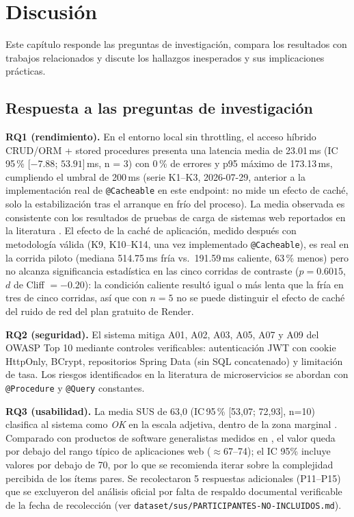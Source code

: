 \chapter{Discusión}
\label{cap:discusion}

Este capítulo responde las preguntas de investigación, compara los resultados con
trabajos relacionados y discute los hallazgos inesperados y sus implicaciones
prácticas.

\section{Respuesta a las preguntas de investigación}

\textbf{RQ1 (rendimiento).} En el entorno local sin throttling, el acceso
híbrido CRUD/ORM + stored procedures presenta una latencia media de
23.01\,ms (IC\,95\,\% [$-7.88$; $53.91$]\,ms, n = 3) con 0\,\% de errores y
p95 máximo de 173.13\,ms, cumpliendo el umbral de 200\,ms (serie K1--K3,
2026-07-29, anterior a la implementación real de \texttt{@Cacheable} en
este endpoint: no mide un efecto de caché, solo la estabilización tras el
arranque en frío del proceso). La media observada es consistente con los
resultados de pruebas de carga de sistemas web reportados en la
literatura \cite{jiang2015,jiang2009}. El efecto de la caché de
aplicación, medido después con metodología válida (K9, K10--K14, una vez
implementado \texttt{@Cacheable}), es real en la corrida piloto (mediana
514.75\,ms fría vs.\ 191.59\,ms caliente, 63\,\% menos) pero no alcanza
significancia estadística en las cinco corridas de contraste
($p=0.6015$, $d$ de Cliff $=-0.20$): la condición caliente resultó igual
o más lenta que la fría en tres de cinco corridas, así que con $n=5$ no
se puede distinguir el efecto de caché del ruido de red del plan
gratuito de Render.

\textbf{RQ2 (seguridad).} El sistema mitiga A01, A02, A03, A05, A07 y A09 del
OWASP Top 10 \cite{owasp2021} mediante controles verificables: autenticación JWT
con cookie HttpOnly, BCrypt, repositorios Spring Data (sin SQL concatenado) y
limitación de tasa. Los riesgos identificados en la literatura de microservicios
\cite{soldani2018,waseem2021,taibi2018} se abordan con \texttt{@Procedure} y
\texttt{@Query} constantes.

\textbf{RQ3 (usabilidad).} La media SUS de 63,0 (IC\,95\,\% [53,07; 72,93], n=10)
clasifica al sistema como \emph{OK} en la escala adjetiva, dentro de la zona
marginal \cite{bangor2009,bangor2008}. Comparado con productos de software
generalistas medidos en \cite{kortum2013}, el valor queda por debajo del rango
típico de aplicaciones web ($\approx$67--74); el IC 95\% incluye valores por debajo de 70, por
lo que se recomienda iterar sobre la complejidad percibida de los ítems pares.
Se recolectaron 5 respuestas adicionales (P11--P15) que se excluyeron del
análisis oficial por falta de respaldo documental verificable de la fecha de
recolección (ver \texttt{dataset/sus/PARTICIPANTES-NO-INCLUIDOS.md}).

